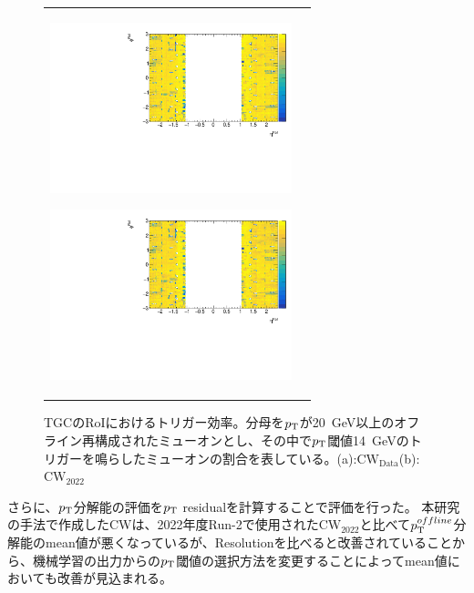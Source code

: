 \begin{figure}
    \begin{tabular}{cc}
    \begin{minipage}[b]{0.45\hsize}%
        \hspace*{-1cm}
        \includegraphics[clip, width=7cm]{fig/5/h2_Data14_Eff.pdf}
        \subcaption{}
        \label{fig:dataEffMU14}
    \end{minipage}%
    \begin{minipage}[b]{0.55\hsize}%
        \includegraphics[clip, width=7cm]{fig/5/h2_v0514_Eff.pdf}
        \subcaption{}
        \label{fig:v05EffMU14}
    \end{minipage}%
    \end{tabular}
    \caption{TGCのRoIにおけるトリガー効率。分母を$p_{\rm{T}}$が20~GeV以上のオフライン再構成されたミューオンとし、その中で$p_{\rm{T}}$閾値14~GeVのトリガーを鳴らしたミューオンの割合を表している。(a):$\mathrm{CW_{Data}}$(b):$\mathrm{CW_{2022}}$}
    \label{EffMU14}
\end{figure}

さらに、$p_{\rm{T}}$分解能の評価を$p_{\rm{T}}$ residualを計算することで評価を行った。
本研究の手法で作成したCWは、2022年度Run-2で使用された$\mathrm{CW_{2022}}$と比べて$p_{\rm{T}}^{offline}$分解能のmean値が悪くなっているが、Resolutionを比べると改善されていることから、機械学習の出力からの$p_{\rm{T}}$閾値の選択方法を変更することによってmean値においても改善が見込まれる。

